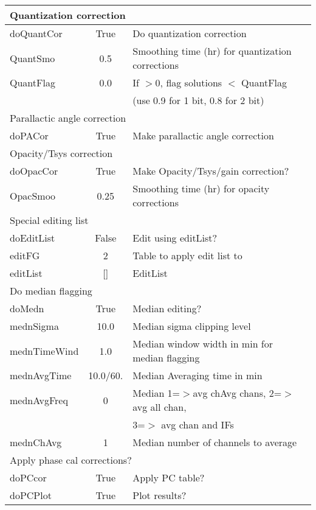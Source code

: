 \documentclass[11pt]{article}
\begin{document}
\vfill
\begin{center}
\begin{tabular}{|l|c|l|}

\hline
\multicolumn{3}{|l|}{Quantization correction} \\
\hline
doQuantCor & True & Do quantization correction \\
QuantSmo & 0.5 & Smoothing time (hr) for quantization corrections \\
QuantFlag & 0.0 & If $>$0, flag solutions $<$ QuantFlag \\
 & & (use 0.9 for 1 bit, 0.8 for 2 bit) \\

\hline
\multicolumn{3}{|l|}{Parallactic angle correction} \\
\hline
doPACor & True & Make parallactic angle correction \\

\hline
\multicolumn{3}{|l|}{Opacity/Tsys correction} \\
\hline
doOpacCor & True & Make Opacity/Tsys/gain correction? \\
OpacSmoo & 0.25 & Smoothing time (hr) for opacity corrections \\

\hline
\multicolumn{3}{|l|}{Special editing list} \\
\hline
doEditList & False & Edit using editList? \\
editFG & 2 & Table to apply edit list to \\
editList & [] & EditList \\

\hline
\multicolumn{3}{|l|}{Do median flagging} \\
\hline
doMedn & True & Median editing? \\
mednSigma & 10.0 & Median sigma clipping level \\
mednTimeWind & 1.0 & Median window width in min for median flagging \\
mednAvgTime & 10.0/60. & Median Averaging time in min \\
mednAvgFreq & 0 & Median 1=$>$avg chAvg chans, 2=$>$avg all chan, \\
 & & 3=$>$ avg chan and IFs \\
mednChAvg & 1 & Median number of channels to average \\

\hline
\multicolumn{3}{|l|}{Apply phase cal corrections?} \\
\hline
doPCcor & True & Apply PC table? \\
doPCPlot & True & Plot results? \\

\hline
\end{tabular}
\end{center}
\end{document}
